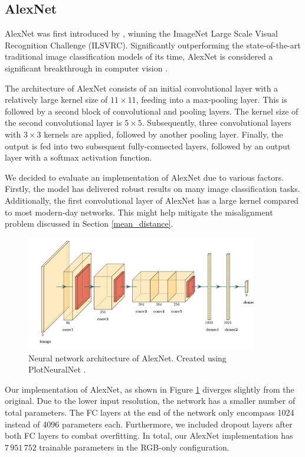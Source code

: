 \documentclass{l4proj}
\begin{document}
\subsection{AlexNet}
\label{alexnet}

AlexNet was first introduced by \citet{krizhevsky_imagenet_2012}, winning the ImageNet Large Scale Visual Recognition Challenge (ILSVRC). Significantly outperforming the state-of-the-art traditional image classification models of its time, AlexNet is considered a significant breakthrough in computer vision \citep{alom_history_2018}.

The architecture of AlexNet consists of an initial convolutional layer with a relatively large kernel size of $11 \times 11$, feeding into a max-pooling layer. This is followed by a second block of convolutional and pooling layers. The kernel size of the second convolutional layer is $5 \times 5$. Subsequently, three convolutional layers with $3 \times 3$ kernels are applied, followed by another pooling layer. Finally, the output is fed into two subsequent fully-connected layers, followed by an output layer with a softmax activation function.

We decided to evaluate an implementation of AlexNet due to various factors. Firstly, the model has delivered robust results on many image classification tasks. Additionally, the first convolutional layer of AlexNet has a large kernel compared to most modern-day networks. This might help mitigate the misalignment problem discussed in Section \ref{mean_distance}.

\begin{figure}[ht]
  \centering
  \includegraphics[width=0.9\textwidth]{images/models/alexnet}
  \caption{Neural network architecture of AlexNet. Created using PlotNeuralNet \citep{iqbal_harisiqbal88plotneuralnet_2018}.}
  \label{fig:alexnet}
\end{figure}

Our implementation of AlexNet, as shown in Figure \ref{fig:alexnet} diverges slightly from the original. Due to the lower input resolution, the network has a smaller number of total parameters. The FC layers at the end of the network only encompass 1024 instead of 4096 parameters each. Furthermore, we included dropout layers after both FC layers to combat overfitting. In total, our AlexNet implementation has $7\,951\,752$ trainable parameters in the RGB-only configuration.
\end{document}
